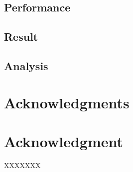 \documentclass[conference,compsoc]{IEEEtran}
\begin{document}
\subsection{Performance}

\subsection{Result}

\subsection{Analysis}



\ifCLASSOPTIONcompsoc
  \section*{Acknowledgments}
\else
  \section*{Acknowledgment}
\fi










%
%
\begin{thebibliography}{1}
 XXXXXXX
\end{thebibliography}





\end{document}
